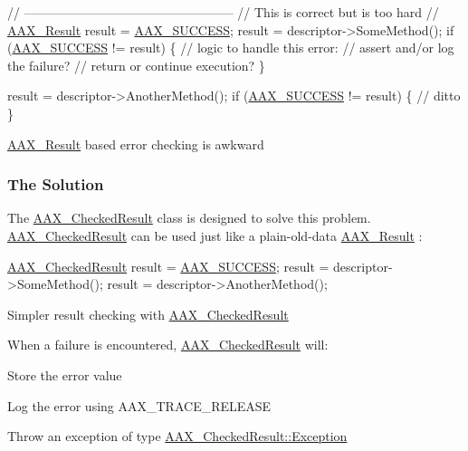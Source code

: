 \begin{DoxyCode}
\textcolor{comment}{// --------------------------------------------------}
\textcolor{comment}{// This is correct but is too hard}
\textcolor{comment}{//}
\hyperlink{a00149_a4d8f69a697df7f70c3a8e9b8ee130d2f}{AAX\_Result} result = \hyperlink{a00207_a5f8c7439f3a706c4f8315a9609811937aeddbd1bb67e3a66e6af54a4b4a7a57b3}{AAX\_SUCCESS};
result = descriptor->SomeMethod();
\textcolor{keywordflow}{if} (\hyperlink{a00207_a5f8c7439f3a706c4f8315a9609811937aeddbd1bb67e3a66e6af54a4b4a7a57b3}{AAX\_SUCCESS} != result) \{
  \textcolor{comment}{// logic to handle this error:}
  \textcolor{comment}{// assert and/or log the failure?}
  \textcolor{comment}{// return or continue execution?}
\}

result = descriptor->AnotherMethod();
\textcolor{keywordflow}{if} (\hyperlink{a00207_a5f8c7439f3a706c4f8315a9609811937aeddbd1bb67e3a66e6af54a4b4a7a57b3}{AAX\_SUCCESS} != result) \{
  \textcolor{comment}{// ditto}
\}
\end{DoxyCode}
 \hyperlink{a00149_a4d8f69a697df7f70c3a8e9b8ee130d2f}{A\+A\+X\+\_\+\+Result} based error checking is awkward

\hypertarget{a00326_describe_checking_results_solution}{}\subsubsection{The Solution}\label{a00326_describe_checking_results_solution}
 The \hyperlink{a00019}{A\+A\+X\+\_\+\+Checked\+Result} class is designed to solve this problem. \hyperlink{a00019}{A\+A\+X\+\_\+\+Checked\+Result} can be used just like a plain-\/old-\/data \hyperlink{a00149_a4d8f69a697df7f70c3a8e9b8ee130d2f}{A\+A\+X\+\_\+\+Result} \+:


\begin{DoxyCode}
\hyperlink{a00019}{AAX\_CheckedResult} result = \hyperlink{a00207_a5f8c7439f3a706c4f8315a9609811937aeddbd1bb67e3a66e6af54a4b4a7a57b3}{AAX\_SUCCESS};
result = descriptor->SomeMethod();
result = descriptor->AnotherMethod();
\end{DoxyCode}
 Simpler result checking with \hyperlink{a00019}{A\+A\+X\+\_\+\+Checked\+Result}

 When a failure is encountered, \hyperlink{a00019}{A\+A\+X\+\_\+\+Checked\+Result} will\+:
\begin{DoxyItemize}
\item Store the error value
\item Log the error using A\+A\+X\+\_\+\+T\+R\+A\+C\+E\+\_\+\+R\+E\+L\+E\+A\+S\+E
\item Throw an exception of type \hyperlink{a00019_a36fd71afc6d62993c1dd96e1ca9fcc0e}{A\+A\+X\+\_\+\+Checked\+Result\+::\+Exception}
\end{DoxyItemize}

